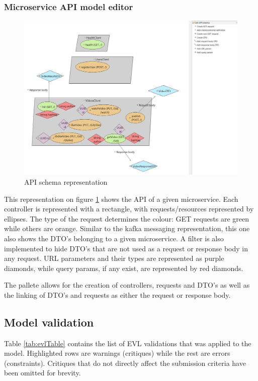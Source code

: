 \documentclass[parskip=full]{article}
\begin{document}
    \subsubsection{Microservice API model editor}
    \begin{figure}
        \includegraphics[height=0.17\paperheight]{vm-api-editor-with-pallette}
        \caption{API schema representation}
        \label{fig:apiEditor}
        \vspace{-2em}
    \end{figure}
    This representation on figure \ref{fig:apiEditor} shows the API of a given microservice.
    Each controller is represented with a rectangle, with requests/resources represented by ellipses.
    The type of the request determines the colour: GET requests are green while others are orange.
    Similar to the kafka messaging representation, this one also shows the DTO's belonging to a given microservice.
    A filter is also implemented to hide DTO's that are not used as a request or response body in any request.
    URL parameters and their types are represented as purple diamonds, while query params, if any exist, are represented by red diamonds.

    The pallete allows for the creation of controllers, requests and DTO's as well as the linking of DTO's and requests as either the request or response body.
    \pagebreak
    \subsection{Model validation}
    Table \ref{tab:evlTable} contains the list of EVL validations that was applied to the model.
    Highlighted rows are warnings (critiques) while the rest are errors (constraints).
    Critiques that do not directly affect the submission criteria have been omitted for brevity.
\end{document}
